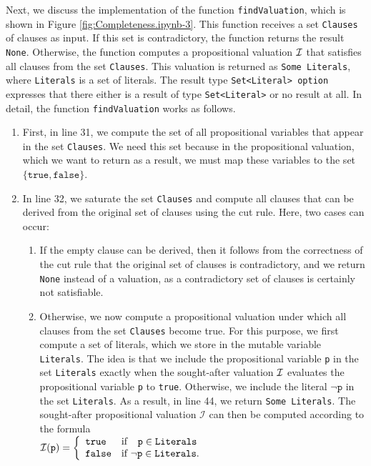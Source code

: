 Next, we discuss the implementation of the function \texttt{findValuation}, which is shown in
Figure \ref{fig:Completeness.ipynb-3}. This function receives a set \texttt{Clauses} of clauses as input.
If this set is contradictory, the function returns the result \texttt{None}.
Otherwise, the function computes a propositional valuation $\mathcal{I}$ that satisfies all clauses from the set
\texttt{Clauses}.  This valuation is returned as \texttt{Some Literals}, where \texttt{Literals} is a set of
literals.  The result type \texttt{Set<Literal> option} expresses that there either is a result of type
\texttt{Set<Literal>} or no result at all. 
In detail, the function \texttt{findValuation} works as follows.
\begin{enumerate}
\item First, in line 31, we compute the set of all propositional variables that appear in the set
      \texttt{Clauses}. We need this set because in the
      propositional valuation, which we want to return as a result, we must
      map these variables to the set $\{ \texttt{true}, \texttt{false} \}$.
\item In line 32, we saturate the set \texttt{Clauses} and compute all clauses that can be derived from the
      original set of clauses using the cut rule. Here, two cases can occur:
      \begin{enumerate}
      \item If the empty clause can be derived, then it follows from the correctness of the cut rule
            that the original set of clauses is contradictory, and we return \texttt{None} instead of a valuation,
            as a contradictory set of clauses is certainly not satisfiable.
      \item Otherwise, we now compute a propositional valuation under which all clauses from
            the set \texttt{Clauses} become true. For this purpose, we first compute a set of
            literals, which we store in the mutable variable \texttt{Literals}. The idea is that we
            include the propositional variable \texttt{p} in the set \texttt{Literals} exactly when
            the sought-after valuation $\mathcal{I}$ evaluates the propositional
            variable \texttt{p} to \texttt{true}. Otherwise, we include the
            literal $\neg \texttt{p}$ in the set \texttt{Literals}. As a result, in
            line 44, we return \texttt{Some Literals}. The sought-after propositional valuation
            $\mathcal{I}$ can then be computed according to the formula  
            \\[0.2cm]
            \hspace*{1.3cm}
            $\mathcal{I}(\texttt{p}) = \left\{
             \begin{array}{ll}
               \texttt{true}  & \mbox{if $\hspace*{0.25cm}\texttt{p} \in \texttt{Literals}$} \\
               \texttt{false} & \mbox{if $\neg\texttt{p} \in \texttt{Literals}$.}
             \end{array}\right.
            $
           

\end{enumerate}
\end{enumerate}

